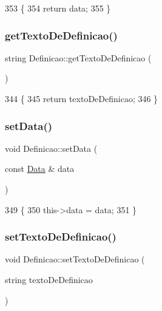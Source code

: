 \begin{DoxyCode}
353 \{
354   \textcolor{keywordflow}{return} data;
355 \}
\end{DoxyCode}
\mbox{\label{class_definicao_accdaa35b92e35e50f62b32265f28c49d}} 
\subsubsection{\texorpdfstring{get\+Texto\+De\+Definicao()}{getTextoDeDefinicao()}}
{\footnotesize\ttfamily string Definicao\+::get\+Texto\+De\+Definicao (\begin{DoxyParamCaption}{ }\end{DoxyParamCaption})\hspace{0.3cm}{\ttfamily [inline]}}


\begin{DoxyCode}
344 \{
345   \textcolor{keywordflow}{return} textoDeDefinicao;
346 \}
\end{DoxyCode}
\mbox{\label{class_definicao_a3660abc2f1311be4b88011da6ada736e}} 
\subsubsection{\texorpdfstring{set\+Data()}{setData()}}
{\footnotesize\ttfamily void Definicao\+::set\+Data (\begin{DoxyParamCaption}\item[{const \mbox{\hyperlink{class_data}{Data}} \&}]{data }\end{DoxyParamCaption})\hspace{0.3cm}{\ttfamily [inline]}}


\begin{DoxyCode}
349 \{
350   this->data = data;
351 \}
\end{DoxyCode}
\mbox{\label{class_definicao_a4c4f6ff99c330cde93a0ffb6500489ad}} 
\subsubsection{\texorpdfstring{set\+Texto\+De\+Definicao()}{setTextoDeDefinicao()}}
{\footnotesize\ttfamily void Definicao\+::set\+Texto\+De\+Definicao (\begin{DoxyParamCaption}\item[{string}]{texto\+De\+Definicao }\end{DoxyParamCaption})\hspace{0.3cm}{\ttfamily [inline]}}



